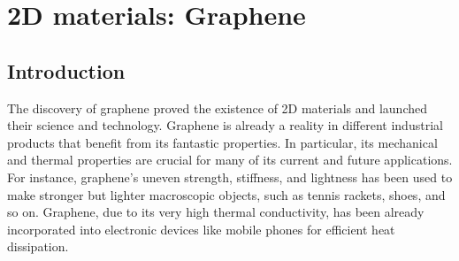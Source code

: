 
\chapter{2D materials: Graphene} %

\label{Chapter8} %




\section{Introduction}

The discovery of graphene\cite{novoselov2004electric,novoselov2005two,novoselov2005twoo,zhang2005experimental} proved 
the existence of 2D materials and launched their science and technology. Graphene is already a reality in different 
industrial products\cite{Kong2019path} that benefit from its fantastic properties. In particular, its mechanical and 
thermal properties are crucial for many of its current and future applications. For instance, graphene's uneven 
strength, stiffness, and lightness\cite{lee2008measurement} has been used to make stronger but lighter macroscopic 
objects, such as tennis rackets, shoes, and so on. Graphene, due to its very high thermal 
conductivity\cite{ghosh2008extremely}, has been already incorporated into electronic devices like mobile phones for 
efficient heat dissipation. \\

